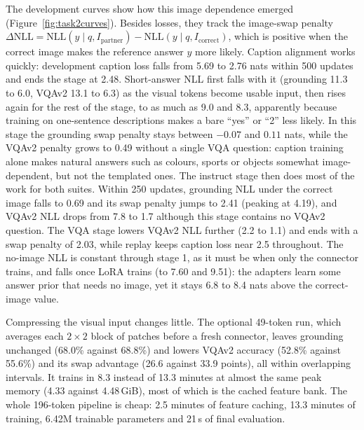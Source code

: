 The development curves show how this image dependence emerged (Figure~\ref{fig:task2curves}). Besides losses, they track the image-swap penalty $\Delta\mathrm{NLL}=\mathrm{NLL}(y\mid q,I_{\mathrm{partner}})-\mathrm{NLL}(y\mid q,I_{\mathrm{correct}})$, which is positive when the correct image makes the reference answer $y$ more likely. Caption alignment works quickly: development caption loss falls from 5.69 to 2.76 nats within 500 updates and ends the stage at 2.48. Short-answer NLL first falls with it (grounding 11.3 to 6.0, VQAv2 13.1 to 6.3) as the visual tokens become usable input, then rises again for the rest of the stage, to as much as 9.0 and 8.3, apparently because training on one-sentence descriptions makes a bare ``yes'' or ``2'' less likely. In this stage the grounding swap penalty stays between $-0.07$ and $0.11$ nats, while the VQAv2 penalty grows to 0.49 without a single VQA question: caption training alone makes natural answers such as colours, sports or objects somewhat image-dependent, but not the templated ones. The instruct stage then does most of the work for both suites. Within 250 updates, grounding NLL under the correct image falls to 0.69 and its swap penalty jumps to 2.41 (peaking at 4.19), and VQAv2 NLL drops from 7.8 to 1.7 although this stage contains no VQAv2 question. The VQA stage lowers VQAv2 NLL further (2.2 to 1.1) and ends with a swap penalty of 2.03, while replay keeps caption loss near 2.5 throughout. The no-image NLL is constant through stage 1, as it must be when only the connector trains, and falls once LoRA trains (to 7.60 and 9.51): the adapters learn some answer prior that needs no image, yet it stays 6.8 to 8.4 nats above the correct-image value.

Compressing the visual input changes little. The optional 49-token run, which averages each $2\times2$ block of patches before a fresh connector, leaves grounding unchanged (68.0\% against 68.8\%) and lowers VQAv2 accuracy (52.8\% against 55.6\%) and its swap advantage (26.6 against 33.9 points), all within overlapping intervals. It trains in 8.3 instead of 13.3 minutes at almost the same peak memory (4.33 against 4.48\,GiB), most of which is the cached feature bank. The whole 196-token pipeline is cheap: 2.5 minutes of feature caching, 13.3 minutes of training, 6.42M trainable parameters and 21\,s of final evaluation.
